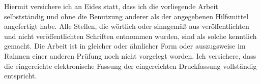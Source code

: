 \documentclass[12pt,a4paper,onecolumn]{scrartcl}
\begin{document}
Hiermit versichere ich an Eides statt, dass ich die vorliegende Arbeit selbstständig und ohne die Benutzung anderer als der angegebenen Hilfsmittel angefertigt habe. Alle Stellen, die wörtlich oder sinngemäß aus veröffentlichten und nicht veröffentlichten Schriften entnommen wurden, sind als solche kenntlich gemacht. Die Arbeit ist in gleicher oder ähnlicher Form oder auszugsweise im Rahmen einer anderen Prüfung noch nicht vorgelegt worden. Ich versichere, dass die eingereichte elektronische Fassung der eingereichten Druckfassung vollständig  entspricht.
\end{document}
